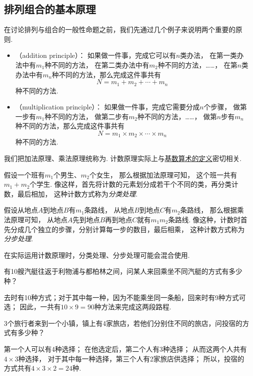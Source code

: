 \subsection{排列组合的基本原理}
在讨论排列与组合的一般性命题之前，我们先通过几个例子来说明两个重要的原则.
\begin{itemize}
	\item {}（addition principle）：
	如果做一件事，完成它可以有\(n\)类办法，
	在第一类办法中有\(m_1\)种不同的方法，
	在第二类办法中有\(m_2\)种不同的方法，……，
	在第\(n\)类办法中有\(m_n\)种不同的方法，那么完成这件事共有\begin{equation*}
		N = m_1 + m_2 + \dotsb + m_n
	\end{equation*}种不同的方法.

	\item {}（multiplication principle）：
	如果做一件事，完成它需要分成\(n\)个步骤，
	做第一步有\(m_1\)种不同的方法，
	做第二步有\(m_2\)种不同的方法，……，
	做第\(n\)步有\(m_n\)种不同的方法，那么完成这件事共有\begin{equation*}
		N = m_1 \times m_2 \times \dotsm \times m_n
	\end{equation*}种不同的方法.
\end{itemize}
我们把加法原理、乘法原理统称为.
计数原理实际上与\hyperref[definition:基数.基数算术的定义]{基数算术的定义}密切相关.

假设一个班有\(m_1\)个男生、\(m_2\)个女生，
那么根据加法原理可知，
这个班一共有\(m_1 + m_2\)个学生.
像这样，首先将计数的元素划分成若干个不同的类，再分类计数，最后相加，
这种计数方式称为\emph{分类处理}.

假设从地点\(A\)到地点\(B\)有\(m_1\)条路线，
从地点\(B\)到地点\(C\)有\(m_2\)条路线，
那么根据乘法原理可知，
从地点\(A\)先到地点\(B\)再到地点\(C\)就有\(m_1 m_2\)条路线.
像这种，计数时首先分成几个独立的步骤，分别计算每一步的数目，最后相乘，
这种计数方式称为\emph{分步处理}.

在实际运用计数原理时，分类处理、分步处理可能会混合使用.

\begin{example}
有10艘汽艇往返于利物浦与都柏林之间，问某人来回乘坐不同汽艇的方式有多少种？
\begin{solution}
去时有10种方式；对于其中每一种，因为不能乘坐同一条船，回来时有9种方式可选；
因此，一共有\(10 \times 9 = 90\)种方法来完成这两段路程.
\end{solution}
\end{example}

\begin{example}
3个旅行者来到一个小镇，镇上有4家旅店，若他们分别住不同的旅店，问投宿的方式有多少种？
\begin{solution}
第一个人可以有4种选择；
在他选定后，第二个人有3种选择；
从而这两个人共有\(4 \times 3\)种选择，
对于其中每一种选择，第三个人有2家旅店供选择；
所以，投宿的方式共有\(4 \times 3 \times 2 = 24\)种.
\end{solution}
\end{example}

